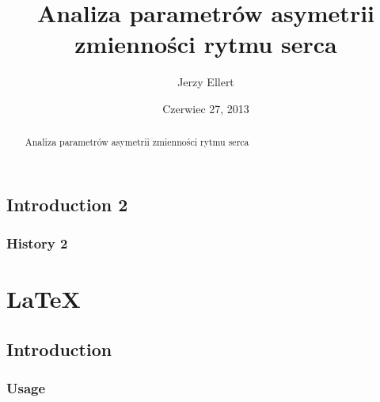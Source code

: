 \documentclass[]{report}   %
\begin{document}
\title{Analiza parametrów asymetrii zmienności rytmu serca}
\author{Jerzy Ellert}
\date{Czerwiec 27, 2013}
\maketitle

\begin{abstract}
	Analiza parametrów asymetrii zmienności rytmu serca 
\end{abstract}



\section{Introduction 2}     %
\subsection{History 2}       %

\chapter{\LaTeX}           %
\section{Introduction}     %
\subsection{Usage}         %

\end{document}
